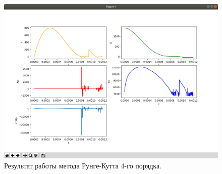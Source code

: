 \begin{figure}[H]
    \centering
    \includegraphics[scale=0.4]{data/image/work.png}
    \caption{Результат работы метода Рунге-Кутта 4-го порядка.}
\end{figure}
